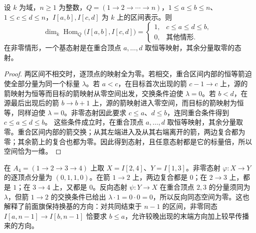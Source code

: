 \begin{proposition}\label{b5:prop:interval-hom}
	设 \(k\) 为域，\(n\ge1\) 为整数，\(Q=(1\to2\to\cdots\to n)\)，\(1\le a\le b\le n\)、\(1\le c\le d\le n\)，\(I[a,b],I[c,d]\) 为 \(k\) 上的区间表示。则
	\[
		\dim_k\operatorname{Hom}_Q\bigl(I[a,b],I[c,d]\bigr)
		=\begin{cases}
			1,&c\le a\le d\le b,\\
			0,&\text{其他情形}.
		\end{cases}
	\]
	在非零情形，一个基态射是在重合顶点 \(a,\ldots,d\) 取恒等映射，其余分量取零的态射。
\end{proposition}
\begin{proof}
	两区间不相交时，逐顶点的映射全为零。若相交，重合区间内部的恒等箭迫使全部分量为同一个标量 \(\lambda\)。若 \(a<c\)，在目标首次出现的箭 \(c-1\to c\) 上，源的箭映射为恒等而目标的箭映射从零空间出发，交换条件迫使 \(\lambda=0\)。若 \(b<d\)，在源最后出现后的箭 \(b\to b+1\) 上，源的箭映射进入零空间，而目标的箭映射为恒等，同样迫使 \(\lambda=0\)。非零态射因此要求 \(c\le a\)、\(d\le b\)，连同重合条件得到 \(c\le a\le d\le b\)。 这些条件成立时，在重合顶点 \(a,\ldots,d\) 取恒等映射，其余分量取零。重合区间内部的箭交换；从其左端进入及从其右端离开的箭，两边复合都为零；其余箭上的复合也都为零。因此得到态射，且任意态射都是它的标量倍，所以空间恰为一维。
\end{proof}
在 \(A_4=(1\to2\to3\to4)\) 上取 \(X=I[2,4]\)、\(Y=I[1,3]\)。非零态射 \(\varphi:X\to Y\) 的逐顶点分量为 \((0,1,1,0)\)。在箭 \(1\to2\) 上，两边复合都是 \(0\)；在 \(2\to3\) 上，都是 \(1\)；在 \(3\to4\) 上，又都是 \(0\)。反向态射 \(\psi:Y\to X\) 在重合顶点 \(2,3\) 的分量须同为 \(\lambda\)，但箭 \(1\to2\) 的交换条件已给出 \(\lambda\cdot1=0\cdot0=0\)，所以反向同态空间为零。这也解释了前面旗保持换基的方向：对共同结束于 \(n-1\) 的区间，非零同态 \(I[a,n-1]\to I[b,n-1]\) 恰要求 \(b\le a\)，允许较晚出现的末端方向加上较早传播来的方向。
